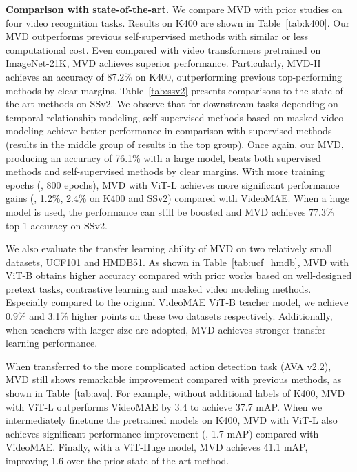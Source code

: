 \documentclass[10pt,twocolumn,letterpaper]{article}
\makeatletter
\newcommand*{\system}{MVD\@\xspace}
\makeatother
\begin{document}
\vspace{0.05in}
\noindent \textbf{Comparison with state-of-the-art.}  We compare MVD with prior studies on four video recognition tasks. Results on K400 are shown in Table~\ref{tab:k400}. Our MVD outperforms previous self-supervised methods with similar or less computational cost. Even compared with video transformers pretrained on ImageNet-21K, MVD achieves superior performance. Particularly, \system-H achieves an accuracy of 87.2\% on K400, outperforming previous top-performing methods by clear margins.
Table~\ref{tab:ssv2} presents comparisons to the state-of-the-art methods on SSv2. We observe that for downstream tasks depending on temporal relationship modeling, self-supervised methods based on masked video modeling achieve better performance in comparison with supervised methods (\cf results in the middle group of  \vs results in the top group). 
Once again, our MVD, producing an accuracy of 76.1\% with a large model, beats both supervised methods and self-supervised methods by clear margins. With more training epochs (\ie, 800 epochs), MVD with ViT-L achieves more significant performance gains (\ie, 1.2\%, 2.4\% on K400 and SSv2) compared with VideoMAE. When a huge model is used, the performance can still be boosted and MVD achieves 77.3\% top-1 accuracy on SSv2.

We also evaluate the transfer learning ability of \system on two relatively small datasets, UCF101 and HMDB51. As shown in Table~\ref{tab:ucf_hmdb}, MVD with ViT-B obtains higher accuracy compared with prior works based on well-designed pretext tasks, contrastive learning and masked video modeling methods. Especially compared to the original VideoMAE \cite{tong2022videomae} ViT-B teacher model, we achieve 0.9\% and 3.1\% higher points on these two datasets respectively. Additionally, when teachers with larger size are adopted, MVD achieves stronger transfer learning performance.

When transferred to the more complicated action detection task (AVA v2.2), MVD still shows remarkable improvement compared with previous methods, as shown in Table~\ref{tab:ava}. For example, without additional labels of K400, MVD with ViT-L outperforms VideoMAE by 3.4 to achieve 37.7 mAP. When we intermediately finetune the pretrained models on K400, MVD with ViT-L also achieves significant performance improvement (\ie, 1.7 mAP) compared with VideoMAE. Finally, with a ViT-Huge model, MVD achieves 41.1 mAP, improving 1.6 over the prior state-of-the-art method.
\end{document}

